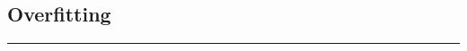 \documentclass{article}
\newcommand{\1}{\mathbf{1}}
\begin{document}
\subsection*{Overfitting}
\noindent\rule{\textwidth}{1pt}
\\
\end{document}
